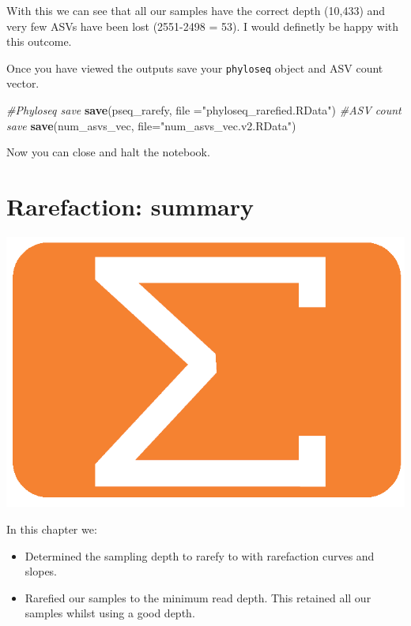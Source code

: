 \documentclass[
]{book}
\newenvironment{Shaded}{\begin{snugshade}}{\end{snugshade}}
\newcommand{\AttributeTok}[1]{\textcolor[rgb]{0.13,0.29,0.53}{#1}}
\newcommand{\CommentTok}[1]{\textcolor[rgb]{0.56,0.35,0.01}{\textit{#1}}}
\newcommand{\FunctionTok}[1]{\textcolor[rgb]{0.13,0.29,0.53}{\textbf{#1}}}
\newcommand{\NormalTok}[1]{#1}
\newcommand{\StringTok}[1]{\textcolor[rgb]{0.31,0.60,0.02}{#1}}
\providecommand{\tightlist}{%
  \setlength{\itemsep}{0pt}\setlength{\parskip}{0pt}}
\begin{document}
With this we can see that all our samples have the correct depth (10,433) and very few ASVs have been lost (2551-2498 = 53).
I would definetly be happy with this outcome.

Once you have viewed the outputs save your \texttt{phyloseq} object and ASV count vector.

\begin{Shaded}
\begin{Highlighting}[]
\CommentTok{\#Phyloseq save}
\FunctionTok{save}\NormalTok{(pseq\_rarefy, }\AttributeTok{file =}\StringTok{"phyloseq\_rarefied.RData"}\NormalTok{)}
\CommentTok{\#ASV count save}
\FunctionTok{save}\NormalTok{(num\_asvs\_vec, }\AttributeTok{file=}\StringTok{"num\_asvs\_vec.v2.RData"}\NormalTok{)}
\end{Highlighting}
\end{Shaded}

Now you can close and halt the notebook.

\hypertarget{rarefaction-summary}{%
\section{Rarefaction: summary}\label{rarefaction-summary}}

\includegraphics{figures/sum_orange.png}

In this chapter we:

\begin{itemize}
\tightlist
\item
  Determined the sampling depth to rarefy to with rarefaction curves and slopes.
\item
  Rarefied our samples to the minimum read depth. This retained all our samples whilst using a good depth.
\end{itemize}
\end{document}

